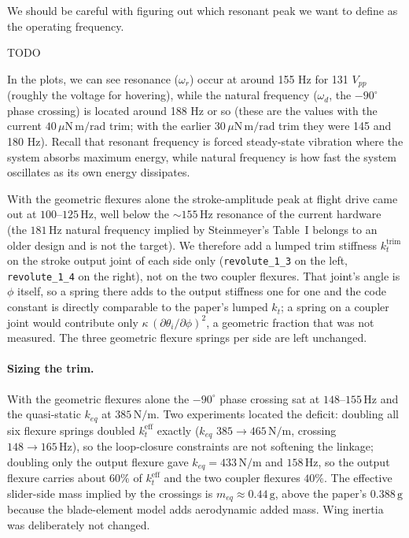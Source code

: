 \documentclass{article}
\begin{document}
We should be careful with figuring out which resonant peak we want to define as the operating frequency. 

TODO 

In the plots, we can see resonance (\(\omega_r\)) occur at around 155 Hz for 131 \(V_{pp}\) (roughly the voltage for hovering), while the natural frequency (\(\omega_d\), the \(-90^\circ\) phase crossing) is located around 188 Hz or so (these are the values with the current \(40\,\mu\mathrm{N\,m/rad}\) trim; with the earlier \(30\,\mu\mathrm{N\,m/rad}\) trim they were 145 and 180 Hz). Recall that resonant frequency is forced steady-state vibration where the system absorbs maximum energy, while natural frequency is how fast the system oscillates as its own energy dissipates.  

With the geometric flexures alone the stroke-amplitude peak at flight drive came out at \(100\)--\(125\,\mathrm{Hz}\), well below the \(\sim 155\,\mathrm{Hz}\) resonance of the current hardware (the \(181\,\mathrm{Hz}\) natural frequency implied by Steinmeyer's Table~I belongs to an older design and is not the target). We therefore add a lumped trim stiffness \(k_t^{\mathrm{trim}}\) on the stroke output joint of each side only (\texttt{revolute\_1\_3} on the left, \texttt{revolute\_1\_4} on the right), not on the two coupler flexures. That joint's angle is \(\phi\) itself, so a spring there adds to the output stiffness one for one and the code constant is directly comparable to the paper's lumped \(k_t\); a spring on a coupler joint would contribute only \(\kappa\,(\partial\theta_i/\partial\phi)^2\), a geometric fraction that was not measured. The three geometric flexure springs per side are left unchanged.

\paragraph{Sizing the trim.} With the geometric flexures alone the \(-90^\circ\) phase crossing sat at \(148\)--\(155\,\mathrm{Hz}\) and the quasi-static \(k_{eq}\) at \(385\,\mathrm{N/m}\). Two experiments located the deficit: doubling all six flexure springs doubled \(k_t^{\mathrm{eff}}\) exactly (\(k_{eq}\) \(385 \to 465\,\mathrm{N/m}\), crossing \(148 \to 165\,\mathrm{Hz}\)), so the loop-closure constraints are not softening the linkage; doubling only the output flexure gave \(k_{eq} = 433\,\mathrm{N/m}\) and \(158\,\mathrm{Hz}\), so the output flexure carries about \(60\%\) of \(k_t^{\mathrm{eff}}\) and the two coupler flexures \(40\%\). The effective slider-side mass implied by the crossings is \(m_{eq} \approx 0.44\,\mathrm{g}\), above the paper's \(0.388\,\mathrm{g}\) because the blade-element model adds aerodynamic added mass. Wing inertia was deliberately not changed.
\end{document}
